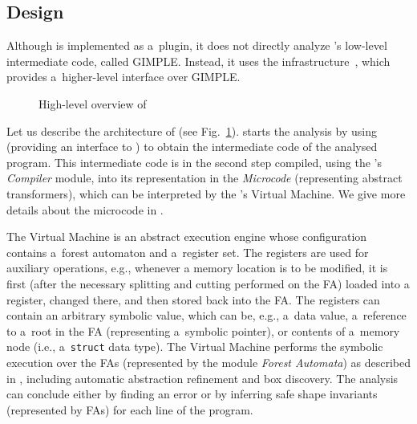 {%
\subsection{Design}

Although \forester is implemented as a~\gcc plugin, it does not directly
analyze \gcc's low-level intermediate code, called GIMPLE.
Instead, it uses the \codelistener infrastructure~\cite{cl11},
which provides a~higher-level interface over GIMPLE.

\begin{figure}[t]
	\begin{center}
		
	\end{center}
	\caption{High-level overview of \forester}
	\label{fig:fa_exec}
\end{figure}


Let us describe the architecture of \forester (see Fig.~\ref{fig:fa_exec}).
\forester starts the analysis by using \codelistener (providing an interface to
\gcc) to obtain the intermediate code of the analysed program.
This intermediate code is in the second step compiled, using the \forester's
\emph{Compiler} module, into its representation in the \forester
\emph{Microcode} (representing abstract transformers), which can be interpreted
by the \forester's Virtual Machine.
We give more details about the microcode in .

The Virtual Machine is an abstract execution engine whose configuration contains
a~forest automaton and a~register set.
The registers are used for auxiliary operations, e.g., whenever a memory
location is to be modified, it is first (after the necessary splitting and
cutting performed on the FA) loaded into a register, changed there, and then
stored back into the FA.
The registers can contain an arbitrary symbolic value, which can be, e.g.,
a~data value, a~reference to a~root in the FA (representing a~symbolic pointer),
or contents of a~memory node (i.e., a~\texttt{struct} data type).
The Virtual Machine performs the symbolic execution over the FAs (represented by
the module \emph{Forest Automata}) as described in ,
including automatic abstraction refinement and box discovery.
The analysis can conclude either by finding an error or by inferring
safe shape invariants (represented by FAs) for each line of the program.

}
